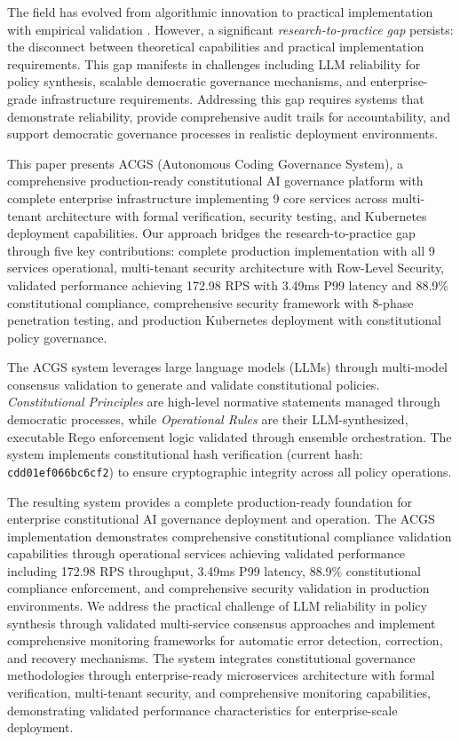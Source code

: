 \documentclass[manuscript,screen,9pt]{acmart}
\begin{document}
\begin{table}[!htb]
The field has evolved from algorithmic innovation to practical implementation with empirical validation \cite{StanfordJBLP2024AIGovernanceWeb3, StanfordLaw2025BulletProof}. However, a significant \textit{research-to-practice gap} persists: the disconnect between theoretical capabilities and practical implementation requirements. This gap manifests in challenges including LLM reliability for policy synthesis, scalable democratic governance mechanisms, and enterprise-grade infrastructure requirements. Addressing this gap requires systems that demonstrate reliability, provide comprehensive audit trails for accountability, and support democratic governance processes in realistic deployment environments.

This paper presents ACGS (Autonomous Coding Governance System), a comprehensive production-ready constitutional AI governance platform with complete enterprise infrastructure implementing 9 core services across multi-tenant architecture with formal verification, security testing, and Kubernetes deployment capabilities. Our approach bridges the research-to-practice gap through five key contributions: complete production implementation with all 9 services operational, multi-tenant security architecture with Row-Level Security, validated performance achieving 172.98 RPS with 3.49ms P99 latency and 88.9\% constitutional compliance, comprehensive security framework with 8-phase penetration testing, and production Kubernetes deployment with constitutional policy governance.

The ACGS system leverages large language models (LLMs) through multi-model consensus validation to generate and validate constitutional policies. \textit{Constitutional Principles} are high-level normative statements managed through democratic processes, while \textit{Operational Rules} are their LLM-synthesized, executable Rego enforcement logic validated through ensemble orchestration. The system implements constitutional hash verification (current hash: \texttt{cdd01ef066bc6cf2}) to ensure cryptographic integrity across all policy operations.

The resulting system provides a complete production-ready foundation for enterprise constitutional AI governance deployment and operation. The ACGS implementation demonstrates comprehensive constitutional compliance validation capabilities through operational services achieving validated performance including 172.98 RPS throughput, 3.49ms P99 latency, 88.9\% constitutional compliance enforcement, and comprehensive security validation in production environments. We address the practical challenge of LLM reliability in policy synthesis through validated multi-service consensus approaches and implement comprehensive monitoring frameworks for automatic error detection, correction, and recovery mechanisms. The system integrates constitutional governance methodologies through enterprise-ready microservices architecture with formal verification, multi-tenant security, and comprehensive monitoring capabilities, demonstrating validated performance characteristics for enterprise-scale deployment.


\end{table}
\end{document}
